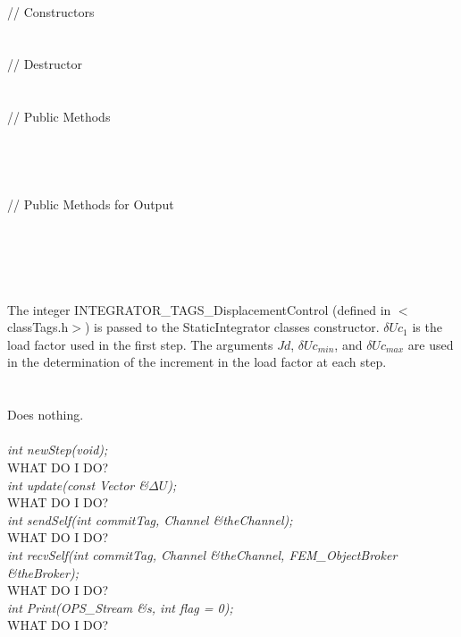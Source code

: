  \\
\indent // Constructors \\
\\ \\
\indent // Destructor \\
\\  \\
\indent // Public Methods \\
 \\
 \\
 \\ \\
\indent // Public Methods for Output\\
\\ 
\\ 
\\

 \\
\\ 
The integer INTEGRATOR\_TAGS\_DisplacementControl (defined in
$<$classTags.h$>$) is passed to the StaticIntegrator classes
constructor. $\delta Uc_1$ is the load factor used in the first
step. The arguments $Jd$, $\delta Uc_{min}$, and $\delta
Uc_{max}$ are used in the determination of the increment in the
load factor at each step. \\



 \\
\\ 
Does nothing. \\

\\

{\em int newStep(void);} \\
WHAT DO I DO?\\

{\em int update(const Vector \&$\Delta U$);} \\
WHAT DO I DO?\\

{\em int sendSelf(int commitTag, Channel \&theChannel); } \\ 
WHAT DO I DO?\\

{\em int recvSelf(int commitTag, Channel \&theChannel, 
FEM\_ObjectBroker \&theBroker); } \\ 
WHAT DO I DO?\\

{\em int Print(OPS_Stream \&s, int flag = 0);}\\
WHAT DO I DO?